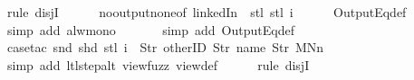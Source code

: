 \begin{isabellebody}
\ {\isacharparenleft}rule\ disjI{}{\isacharparenright}\isanewline
\ \ \ \ \isamarkupfalse%
\ no{\isacharunderscore}output{\isacharunderscore}none{\isacharbrackleft}of\ linkedIn\ {\isachardoublequoteopen}{\isacharless}{\isachargreater}{\isachardoublequoteclose}\ {\isachardoublequoteopen}stl\ {\isacharparenleft}stl\ i{\isacharparenright}{\isachardoublequoteclose}{\isacharbrackright}\isanewline
\ \ \ \ \isamarkupfalse%
\ OutputEq{\isacharunderscore}def\isanewline
\ \ \ \ \ \isamarkupfalse%
\ {\isacharparenleft}simp\ add{\isacharcolon}\ alw{\isacharunderscore}mono{\isacharparenright}\isanewline
\ \ \ \ \ \isamarkupfalse%
\ {\isacharparenleft}simp\ add{\isacharcolon}\ OutputEq{\isacharunderscore}def{\isacharparenright}\isanewline
\ \ \ \ \isamarkupfalse%
\ {\isacharparenleft}case{\isacharunderscore}tac\ {\isachardoublequoteopen}{\isacharparenleft}snd\ {\isacharparenleft}shd\ {\isacharparenleft}stl\ i{\isacharparenright}{\isacharparenright}{\isacharparenright}\ {\isacharequal}\ {\isacharbrackleft}Str\ {\isacharprime}{\isacharprime}otherID{\isacharprime}{\isacharprime}{\isacharcomma}\ Str\ {\isacharprime}{\isacharprime}name{\isacharprime}{\isacharprime}{\isacharcomma}\ Str\ {\isacharprime}{\isacharprime}MNn{}{\isacharprime}{\isacharprime}{\isacharbrackright}{\isachardoublequoteclose}{\isacharparenright}\isanewline
\ \ \ \ \ \isamarkupfalse%
\ {\isacharparenleft}simp\ add{\isacharcolon}\ ltl{\isacharunderscore}step{\isacharunderscore}alt\ view{\isacharunderscore}fuzz\ view{}{\isacharunderscore}def{\isacharparenright}\isanewline
\ \ \ \ \isamarkupfalse%
\ {\isacharparenleft}rule\ disjI{}{\isacharparenright}\isanewline
\ \ \ \ \isamarkupfalse%
%
\endisatagproof
{\isafoldproof}%
%
\isadelimproof
%
\endisadelimproof
%
\end{isabellebody}
